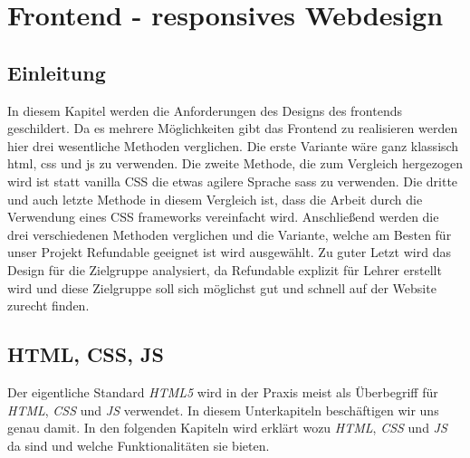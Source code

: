 
\section{Frontend - responsives Webdesign}
	\subsection{Einleitung}
	In diesem Kapitel werden die Anforderungen des Designs des \Gls{frontend}s geschildert. Da es mehrere Möglichkeiten gibt das Frontend zu realisieren werden hier drei wesentliche Methoden verglichen. Die erste Variante wäre ganz klassisch \Gls{html}, \Gls{css} und \Gls{js} zu verwenden. Die zweite Methode, die zum Vergleich hergezogen wird ist statt \Gls{vanilla} CSS die etwas agilere Sprache \Gls{sass} zu verwenden. Die dritte und auch letzte Methode in diesem Vergleich ist, dass die Arbeit durch die Verwendung eines CSS \Gls{framework}s vereinfacht wird. Anschließend werden die drei verschiedenen Methoden verglichen und die Variante, welche am Besten für unser Projekt Refundable geeignet ist wird ausgewählt. Zu guter Letzt wird das Design für die Zielgruppe analysiert, da Refundable explizit für Lehrer erstellt wird und diese Zielgruppe soll sich möglichst gut und schnell auf der Website zurecht finden.
	
	\subsection{HTML, CSS, JS}
	Der eigentliche Standard \textit{HTML5} wird in der Praxis meist als Überbegriff für \textit{HTML}, \textit{CSS} und \textit{JS} verwendet. In diesem Unterkapiteln beschäftigen wir uns genau damit.\cite{html5-css3-handbuch} In den folgenden Kapiteln wird erklärt wozu \textit{HTML}, \textit{CSS} und \textit{JS} da sind und welche Funktionalitäten sie bieten.
	
